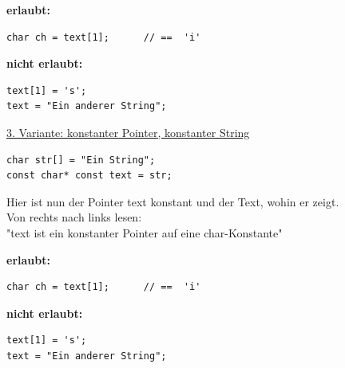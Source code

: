 \noindent
\begin{minipage}{0.45\linewidth}
\textbf{erlaubt:}
\vspace{-\baselineskip}
\begin{lstlisting}
char ch = text[1];		// ==  'i'
\end{lstlisting}
\vfill\null
\end{minipage}
\hspace{0.01\linewidth}
\begin{minipage}{0.4\linewidth}
\textbf{nicht erlaubt:}
\vspace{-\baselineskip}
\begin{lstlisting}
text[1] = 's';
text = "Ein anderer String";
\end{lstlisting}
\vfill\null
\end{minipage}

\underline{3. Variante: konstanter Pointer, konstanter String}\\
\noindent
\begin{minipage}{0.4\linewidth}
\vspace{-\baselineskip}
\begin{lstlisting}
char str[] = "Ein String";
const char* const text = str;
\end{lstlisting}
\end{minipage}
\hspace{0.01\linewidth}
\begin{minipage}{0.6\linewidth}
	Hier ist nun der Pointer text konstant und der Text, wohin er zeigt.\\
	Von rechts nach links lesen:\\"text ist ein konstanter Pointer auf eine char-Konstante"
\end{minipage}


\noindent
\begin{minipage}{0.45\linewidth}
\textbf{erlaubt:}
\vspace{-\baselineskip}
\begin{lstlisting}
char ch = text[1];		// ==  'i'
\end{lstlisting}
\vfill\null
\end{minipage}
\hspace{0.01\linewidth}
\begin{minipage}{0.4\linewidth}
\textbf{nicht erlaubt:}
\vspace{-\baselineskip}
\begin{lstlisting}
text[1] = 's';
text = "Ein anderer String";
\end{lstlisting}
\vfill\null
\end{minipage}


